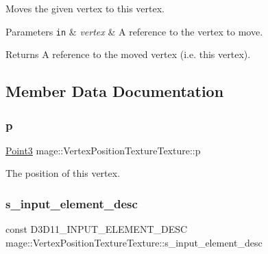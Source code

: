 Moves the given vertex to this vertex.


\begin{DoxyParams}[1]{Parameters}
\mbox{\tt in}  & {\em vertex} & A reference to the vertex to move. \\
\hline
\end{DoxyParams}
\begin{DoxyReturn}{Returns}
A reference to the moved vertex (i.\+e. this vertex). 
\end{DoxyReturn}


\subsection{Member Data Documentation}
\hypertarget{structmage_1_1_vertex_position_texture_texture_aed106149eda65a20e60ebc3b93535270}{}\label{structmage_1_1_vertex_position_texture_texture_aed106149eda65a20e60ebc3b93535270} 
\subsubsection{\texorpdfstring{p}{p}}
{\footnotesize\ttfamily \hyperlink{structmage_1_1_point3}{Point3} mage\+::\+Vertex\+Position\+Texture\+Texture\+::p}

The position of this vertex. \hypertarget{structmage_1_1_vertex_position_texture_texture_aa3d92b247687789245ed11e719ba2421}{}\label{structmage_1_1_vertex_position_texture_texture_aa3d92b247687789245ed11e719ba2421} 
\subsubsection{\texorpdfstring{s\+\_\+input\+\_\+element\+\_\+desc}{s\_input\_element\_desc}}
{\footnotesize\ttfamily const D3\+D11\+\_\+\+I\+N\+P\+U\+T\+\_\+\+E\+L\+E\+M\+E\+N\+T\+\_\+\+D\+E\+SC mage\+::\+Vertex\+Position\+Texture\+Texture\+::s\+\_\+input\+\_\+element\+\_\+desc\hspace{0.3cm}{\ttfamily [static]}}

